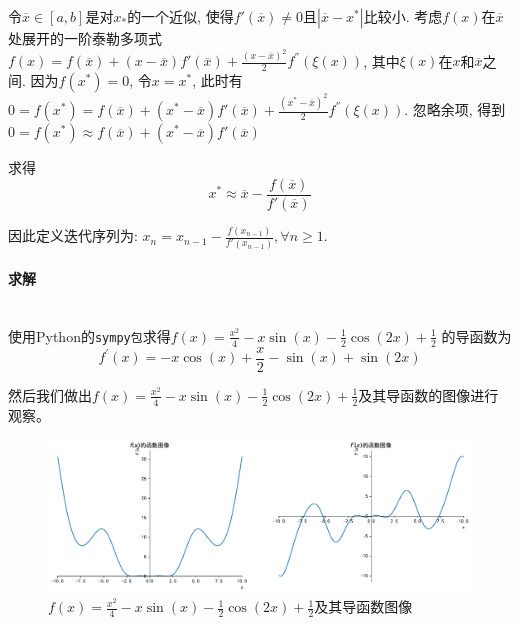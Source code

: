 令$\overline{x} \in \left[a,b\right]$是对$x_{*}$的一个近似, 使得$f'\left(\overline{x} \right) \neq 0$且$\left|\overline{x} - x^{*} \right|$比较小. 考虑$f\left(x\right)$在$\overline{x}$处展开的一阶泰勒多项式$f\left(x\right) = f\left(\overline{x} \right) + \left(x - \overline{x}\right) f' \left(\overline{x} \right) + \frac{\left(x-\overline{x}\right)^2}{2}f^{''}\left(\xi \left(x\right) \right)$, 其中$\xi \left(x \right)$在$x$和$\overline{x}$之间. 因为$f\left(x^{*}\right)=0$, 令$x=x^{*}$, 此时有
$0 = f\left(x^{*}\right) = f\left(\overline{x} \right) + \left(x^{*} - \overline{x}\right) f' \left(\overline{x} \right) + \frac{\left(x^{*}-\overline{x}\right)^2}{2}f^{''}\left(\xi \left(x\right) \right)$. 忽略余项, 得到
$0 = f\left(x^{*}\right) \approx f\left(\overline{x} \right) + \left(x^{*} - \overline{x}\right) f' \left(\overline{x} \right)$

求得$$x^{*} \approx \overline{x} - \frac{f\left(\overline{x}\right)}{f'\left(\overline{x}\right)}$$

因此定义迭代序列为:
$x_n = x_{n-1} - \frac{f\left(x_{n-1} \right)}{f'\left(x_{n-1} \right)},\forall n \geq 1$.

\paragraph{求解}
~\\
使用Python的\texttt{sympy包}求得$f(x) = \frac{x^{2}}{4} - x \sin{\left (x \right )} - \frac{1}{2} \cos{\left (2 x \right )} + \frac{1}{2}$ 的导函数为 $$f^\prime(x) = - x \cos{\left (x \right )} + \frac{x}{2} - \sin{\left (x \right )} + \sin{\left (2 x \right )}$$

然后我们做出$f(x) = \frac{x^{2}}{4} - x \sin{\left (x \right )} - \frac{1}{2} \cos{\left (2 x \right )} + \frac{1}{2}$及其导函数的图像进行观察。

\begin{figure}[H]
	\centering
	\caption{$f(x) = \frac{x^{2}}{4} - x \sin{\left (x \right )} - \frac{1}{2} \cos{\left (2 x \right )} + \frac{1}{2}$及其导函数图像}
	\includegraphics[width=\linewidth]{fig4.pdf}
\end{figure}


